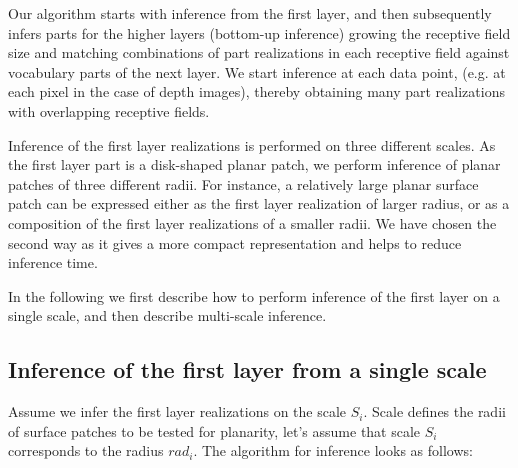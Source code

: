 \documentclass[conference]{IEEEtran}
\begin{document}
{Our algorithm starts with inference from the first layer, and then
subsequently infers parts for the higher layers (bottom-up
inference) growing the receptive field size and matching
combinations of part realizations in each receptive field against
vocabulary parts of the next layer. We start inference at each data
point, (e.g. at each pixel in the case of depth images), thereby
obtaining many part realizations with overlapping receptive fields.

Inference of the first layer realizations is performed on three
different scales. As the first layer part is a disk-shaped planar
patch, we perform inference of planar patches of three different
radii. For instance, a relatively large planar surface patch can be
expressed either as the first layer realization of larger radius, or
as a composition of the first layer realizations of a smaller radii.
We have chosen the second way as it gives a more compact
representation and helps to reduce inference time.

In the following we first describe how to perform inference of the
first layer on a single scale, and then describe multi-scale
inference.

\subsection{Inference of the first layer from a single scale\label{sec:InferenceFirstSingle}}

Assume we infer the first layer realizations on the scale $S_i$.
Scale defines the radii of surface patches to be tested for
planarity, let's assume that scale $S_i$ corresponds to the radius
$rad_i$. The algorithm for inference looks as follows:

}
\end{document}
